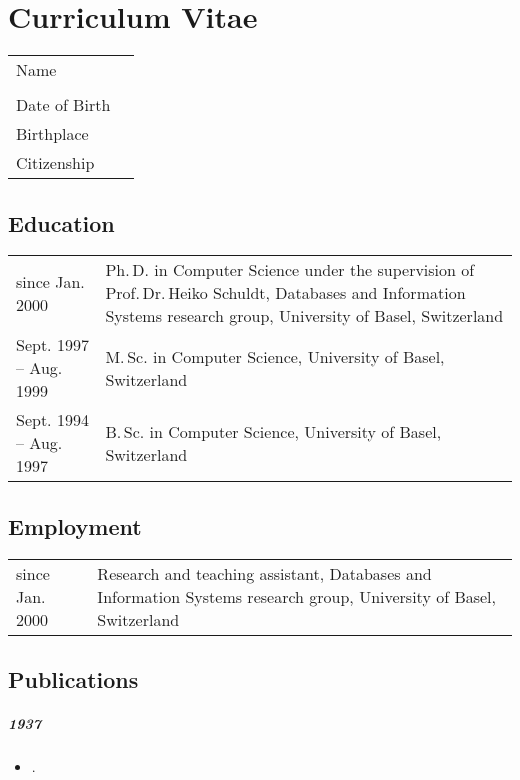 
\chapter*{Curriculum Vitae}


\begin{tabularx}{\textwidth}{>{\raggedleft}p{}X}
	Name  & \thesisauthor \\
	& \thesisauthoraddress \\
	Date of Birth & \thesisauthordateofbirth \\
	Birthplace & \thesisauthorbirthplace \\
	Citizenship & \thesisauthornationalityCv \\
\end{tabularx}

\section*{Education}
\begin{tabularx}{\textwidth}{>{\raggedleft}p{}X}
	since Jan. 2000  & Ph.\,D. in Computer Science under the supervision of Prof.\,Dr.\,Heiko Schuldt, Databases and Information Systems research group, University of Basel, Switzerland \\
	\rule{0pt}{3ex}%
	Sept. 1997 -- Aug. 1999  & M.\,Sc. in Computer Science, University of Basel, Switzerland \\
	\rule{0pt}{3ex}%
	Sept. 1994 -- Aug. 1997  & B.\,Sc. in Computer Science, University of Basel, Switzerland
\end{tabularx}

\section*{Employment}
\begin{tabularx}{\textwidth}{>{\raggedleft}p{}X}
	since Jan. 2000  & Research and teaching assistant, Databases and Information Systems research group, University of Basel, Switzerland
\end{tabularx}

\section*{Publications}

\paragraph{1937}
\begin{itemize}
	\item {}.
\end{itemize}


\cleardoublepage
